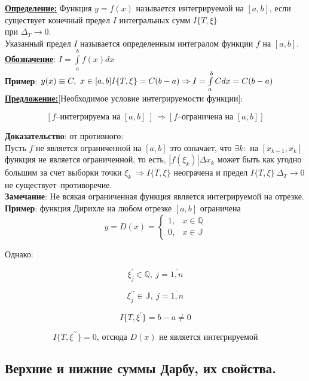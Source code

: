 \documentclass[a4paper,12pt]{article} %
\begin{document}
\underline{\textbf{Определение:}} Функция $y = f(x)$ называется интегрируемой на $[a,b]$, если существует конечный предел $I$ интегральных сумм $I\{T,\xi\}$\\ при $\Delta_T \longrightarrow 0$.\\
Указанный предел $I$ называется определенным интегралом функции $f$ на $[a,b]$.\\

\underline{\textbf{Обозначение}}: $I = \int\limits_{a}^{b} {f(x)dx}$\\

\textbf{Пример}: $y(x)\equiv C,~x\in[a,b]\\
I\{T,\xi\} = C(b-a) \Rightarrow I = \int\limits_{a}^{b} {Cdx} = C(b-a)$\\

\underline{\textbf{Предложение:}}[Необходимое условие интегрируемости функции]:

\[ [f \text{--интегрируема на }[a,b]~] \, \Rightarrow[ f \text{--ограничена на }[a,b] ] \]

\textbf{Доказательство}: от противного:
\\
Пусть $f$ не является ограниченной на $[a,b]$ это означает, что $\exists k:$ на $[x_{k-1},x_k]$
функция не является ограниченной, то есть, $|f(\xi_k)|\Delta x_k$ может быть как угодно большим за счет выборки точки $\xi_k~\Rightarrow I\{T,\xi\}$ неограчена и предел $I\{T,\xi\}~\Delta_T\rightarrow 0$ не существует--противоречие.\\

\textbf{Замечание}: Не всякая ограниченная функция является интегрируемой на отрезке.\\

\textbf{Пример}: функция Дирихле на любом отрезке $[a,b]$ ограничена
$$y=D(x)=\left\{\begin{array}{ll}
1, & x \in \mathbb{Q} \\
0, & x \in \mathbb{J}
\end{array}\right.$$

Однако:

$$\xi_j^{\prime} \in \mathbb{Q},~j = \overline{1,n}$$

$$\xi_j^{\prime \prime} \in \mathbb{J},~j = \overline{1,n}$$

$$I\{T,\xi^{\prime}\} = b-a\neq 0$$

$$I\{T,\xi^{\prime \prime}\} = 0 \text{, отсюда } D(x) \text{ не является интегрируемой}$$

\subsection{Верхние и нижние суммы Дарбу, их свойства.}
\end{document}
